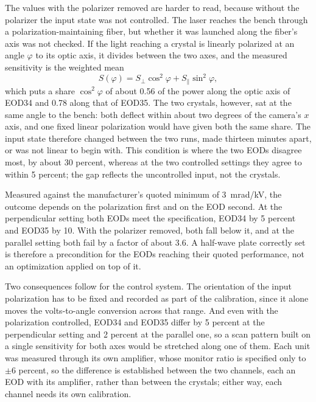 \documentclass{article}
\begin{document}
The values with the polarizer removed are harder to read, because without the polarizer the input
state was not controlled. The laser reaches the bench through a polarization-maintaining fiber,
but whether it was launched along the fiber's axis was not checked. If the light reaching a
crystal is linearly polarized at an angle $\varphi$ to its optic axis, it divides between the two
axes, and the measured sensitivity is the weighted mean
\begin{equation}
    S(\varphi) = S_\perp \cos^2\varphi + S_\parallel \sin^2\varphi ,
\end{equation}
which puts a share $\cos^2\varphi$ of about 0.56 of the power along the optic axis of EOD34 and
0.78 along that of EOD35. The two crystals, however, sat at the same angle to the bench: both
deflect within about two degrees of the camera's $x$ axis, and one fixed linear polarization would
have given both the same share. The input state therefore changed between the two runs, made
thirteen minutes apart, or was not linear to begin with. This condition is where the two EODs
disagree most, by about 30 percent, whereas at the two controlled settings they agree to within
5 percent; the gap reflects the uncontrolled input, not the crystals.

Measured against the manufacturer's quoted minimum of 3~mrad/kV, the outcome depends on the
polarization first and on the EOD second. At the perpendicular setting both EODs meet the
specification, EOD34 by 5 percent and EOD35 by 10. With the polarizer removed,
both fall below it, and at the parallel setting both fail by a factor of
about 3.6. A half-wave plate correctly set is therefore a precondition for the
EODs reaching their quoted performance, not an optimization applied on top of it.

Two consequences follow for the control system. The orientation of the input polarization has to
be fixed and recorded as part of the calibration, since it alone moves the volts-to-angle
conversion across that range. And even with the polarization controlled, EOD34 and EOD35 differ
by 5 percent at the perpendicular setting and 2 percent at the parallel one, so a scan pattern
built on a single sensitivity for both axes would be stretched along one of them. Each unit was
measured through its own amplifier, whose monitor ratio is specified only to $\pm6$ percent, so the
difference is established between the two channels, each an EOD with its amplifier, rather than
between the crystals; either way, each channel needs its own calibration.
\end{document}

